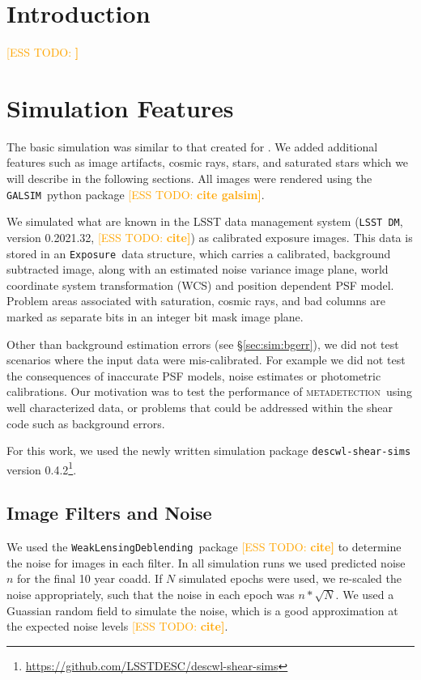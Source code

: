 \documentclass[twocolumn,twocolappendix,astrosym]{openjournal}
\newcommand{\esstodo}[1]{\textcolor{orange}{[ESS TODO: \bf #1]}}
\newcommand{\descwl}{\texttt{WeakLensingDeblending}}
\newcommand{\galsim}{\texttt{GALSIM}}
\newcommand{\calexp}{\texttt{Exposure}}
\newcommand{\dm}{\texttt{LSST DM}}
\newcommand{\mdet}{\textsc{metadetection}}
\begin{document}
\section{Introduction} \label{sec:intro}

\esstodo{}

\section{Simulation Features} \label{sec:sim}

The basic simulation was similar to that created for \citep{mdet20}.  We added
additional features such as image artifacts, cosmic rays, stars, and saturated
stars which we will describe in the following sections.  All images were
rendered using the \galsim\ python package \esstodo{ cite galsim}.

We simulated what are known in the LSST data management system (\dm, version
0.2021.32, \esstodo{cite}) as calibrated exposure images.  This data is stored
in an \calexp\ data structure, which carries a calibrated, background subtracted
image, along with an estimated noise variance image plane, world coordinate
system transformation (WCS) and position dependent PSF model.  Problem areas
associated with saturation, cosmic rays, and bad columns are marked as separate
bits in an integer bit mask image plane.

Other than background estimation errors (see \S \ref{sec:sim:bgerr}), we did not
test scenarios where the input data were mis-calibrated.  For example we did
not test the consequences of inaccurate PSF models, noise estimates or
photometric calibrations.  Our motivation was to test the performance of \mdet\
using well characterized data, or problems that could be addressed within
the shear code such as background errors.

For this work, we used the newly written simulation package
\texttt{descwl-shear-sims} version
0.4.2\footnote{\url{https://github.com/LSSTDESC/descwl-shear-sims}}.

\subsection{Image Filters and Noise} \label{sec:sim:noise}

We used the \descwl\ package \esstodo{cite} to determine the noise for images
in each filter.  In all simulation runs we used predicted noise $n$ for the
final 10 year coadd.  If $N$ simulated epochs were used, we re-scaled the noise
appropriately, such that the noise in each epoch was $n * \sqrt{N}$.  We used a
Guassian random field to simulate the noise, which is a good approximation at
the expected noise levels \esstodo{cite}.
\end{document}
